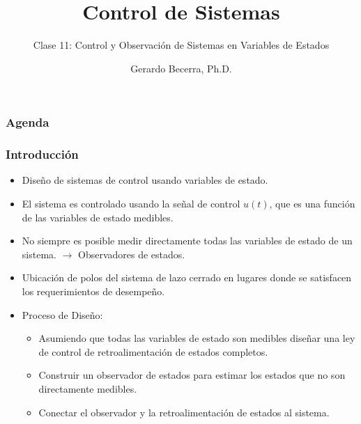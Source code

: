 \documentclass[aspectratio=169,handout]{beamer}
\title{Control de Sistemas}
\subtitle{\small Clase 11: Control y Observación de Sistemas en Variables de Estados}
\author{Gerardo Becerra, Ph.D.}
\institute{Pontificia Universidad Javeriana\\ Departamento de Electrónica}
\date{}
\theoremstyle{definition}
\theoremstyle{plain}
\theoremstyle{remark}
\begin{document}
\frame{\titlepage}	

\begin{frame}[<+->]\frametitle{Agenda}
	\vspace{5mm}
	\tableofcontents
\end{frame}

\begin{frame}[<+->]\frametitle{Introducción}
\centering
\begin{itemize}
	\item Diseño de sistemas de control usando variables de estado.
	\item El sistema es controlado usando la señal de control $u(t)$, que es una función de las variables de estado medibles.
	\item No siempre es posible medir directamente todas las variables de estado de un sistema. $\rightarrow$  Observadores de estados.
	\item Ubicación de polos del sistema de lazo cerrado en lugares donde se satisfacen los requerimientos de desempeño.
	\item Proceso de Diseño:
	\begin{itemize}
		\item Asumiendo que todas las variables de estado son medibles diseñar una ley de control de retroalimentación de estados completos.
		\item Construir un observador de estados para estimar los estados que no son directamente medibles.
		\item Conectar el observador y la retroalimentación de estados al sistema.
	\end{itemize}
\end{itemize}
\end{frame}
\end{document}
